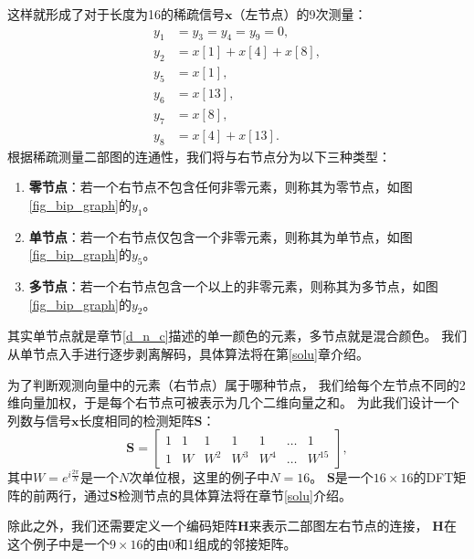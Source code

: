 \documentclass[AutoFakeBold]{LZUThesis}
\begin{document}
这样就形成了对于长度为16的稀疏信号$\mathbf{x}$（左节点）的9次测量：
\begin{equation*}
    \begin{aligned}
        y_1 &= y_3 = y_4 = y_9 = 0, \\
        y_2 &= x[1] + x[4] + x[8], \\
        y_5 &= x[1], \\
        y_6 &= x[13], \\
        y_7 &= x[8], \\
        y_8 &= x[4] + x[13].
    \end{aligned}
\end{equation*}
根据稀疏测量二部图的连通性，我们将与右节点分为以下三种类型：
\begin{enumerate}
    \item \textbf{零节点}：若一个右节点不包含任何非零元素，则称其为零节点，如图\ref{fig_bip_graph}的$y_1$。
    \item \textbf{单节点}：若一个右节点仅包含一个非零元素，则称其为单节点，如图\ref{fig_bip_graph}的$y_5$。
    \item \textbf{多节点}：若一个右节点包含一个以上的非零元素，则称其为多节点，如图\ref{fig_bip_graph}的$y_2$。
\end{enumerate}
其实单节点就是章节\ref{d_n_c}描述的单一颜色的元素，多节点就是混合颜色。
我们从单节点入手进行逐步剥离解码，具体算法将在第\ref{solu}章介绍。

为了判断观测向量中的元素（右节点）属于哪种节点，
我们给每个左节点不同的2维向量加权，于是每个右节点可被表示为几个二维向量之和。
为此我们设计一个列数与信号$\mathbf{x}$长度相同的检测矩阵$\mathbf{S}$：
\begin{equation}
    \mathbf{S}=
    \left[
        \begin{array}{ccccccc}
            1 & 1 & 1  & 1 & 1 & \dots & 1 \\
            1 & W & W^2 & W^3 & W^4 & \dots & W^{15}
        \end{array}
        \right],
    \label{S}
\end{equation}
其中$W = e^{i \frac{2\pi}{N}}$是一个$N$次单位根，这里的例子中$N = 16$。
$\mathbf{S}$是一个$16 \times 16$的DFT矩阵的前两行，通过$\mathbf{S}$检测节点的具体算法将在章节\ref{solu}介绍。

除此之外，我们还需要定义一个编码矩阵$\mathbf{H}$来表示二部图左右节点的连接，
$\mathbf{H}$在这个例子中是一个$9 \times 16$的由0和1组成的邻接矩阵。
\end{document}
